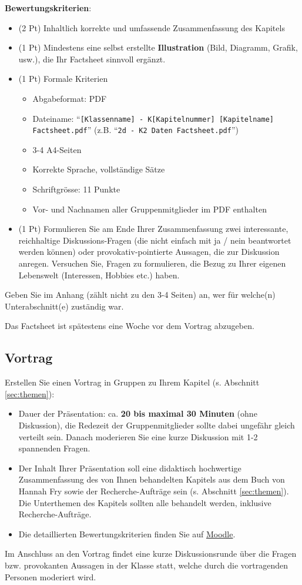 \textbf{Bewertungskriterien}:
\begin{itemize}
	\item (2 Pt) Inhaltlich korrekte und umfassende Zusammenfassung des Kapitels
	\item (1 Pt) Mindestens eine selbst erstellte \textbf{Illustration} (Bild, Diagramm, Grafik, usw.), die Ihr Factsheet sinnvoll ergänzt.
	\item (1 Pt) Formale Kriterien
	      \begin{itemize}
		      \item Abgabeformat: PDF
		      \item Dateiname: ``\texttt{[Klassenname] - K[Kapitelnummer] [Kapitelname] Factsheet.pdf}'' (z.B. ``\texttt{2d - K2 Daten Factsheet.pdf}'')
		      \item 3-4 A4-Seiten
		      \item Korrekte Sprache, vollständige Sätze
		      \item Schriftgrösse: 11 Punkte
		      \item Vor- und Nachnamen aller Gruppenmitglieder im PDF enthalten
	      \end{itemize}
	\item (1 Pt) Formulieren Sie am Ende Ihrer Zusammenfassung zwei interessante, reichhaltige Diskussions-Fragen (die nicht einfach mit ja / nein beantwortet werden können) oder provokativ-pointierte Aussagen, die zur Diskussion anregen. Versuchen Sie, Fragen zu formulieren, die Bezug zu Ihrer eigenen Lebenswelt (Interessen, Hobbies etc.) haben.
\end{itemize}

Geben Sie im Anhang (zählt nicht zu den 3-4 Seiten) an, wer für welche(n) Unterabschnitt(e) zuständig war.

Das Factsheet ist spätestens eine Woche vor dem Vortrag abzugeben.

\subsection{Vortrag}
\label{subsec:ind}

Erstellen Sie einen Vortrag in Gruppen zu Ihrem Kapitel  (s. Abschnitt \ref{sec:themen}):

\begin{itemize}
	\item Dauer der Präsentation: ca. \textbf{20 bis maximal 30 Minuten} (ohne Diskussion), die Redezeit der Gruppenmitglieder sollte dabei ungefähr gleich verteilt sein. Danach moderieren Sie eine kurze Diskussion mit 1-2 spannenden Fragen.
	\item Der Inhalt Ihrer Präsentation soll eine didaktisch hochwertige Zusammenfassung des von Ihnen behandelten Kapitels aus dem Buch von Hannah Fry sowie der Recherche-Aufträge sein (s. Abschnitt \ref{sec:themen}). Die Unterthemen des Kapitels sollten alle behandelt werden, inklusive Recherche-Aufträge.
	\item Die detaillierten Bewertungskriterien finden Sie auf \href{https://moodle.ksimlee.ch/mod/assign/view.php?id=33044}{Moodle}.
\end{itemize}

Im Anschluss an den Vortrag findet eine kurze Diskussionsrunde über die Fragen bzw. provokanten Aussagen in der Klasse statt, welche durch die vortragenden Personen moderiert wird.